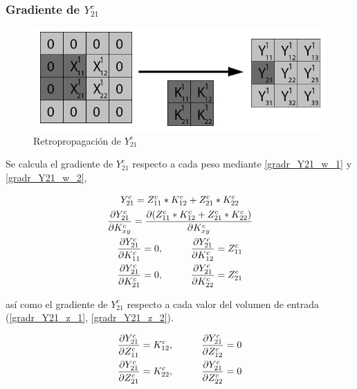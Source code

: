 \subsubsection{Gradiente de $Y^c_{21}$}

\begin{figure}[H]
	\centering
	\includegraphics[width=0.8\linewidth]{imagenes/conv_back_padding_4.jpg} 
	\caption{Retropropagación de $Y^c_{21}$}
\end{figure}

Se calcula el gradiente de $Y^c_{21}$ respecto a cada peso mediante \ref{gradr_Y21_w_1} y \ref{gradr_Y21_w_2},


\begin{gather}
	Y^c_{21} = Z^c_{11} * K^c_{12} + Z^c_{21} * K^c_{22} \\
	\frac{\partial Y^c_{21}}{\partial K^c_{xy}} = \frac{\partial (Z^c_{11} * K^c_{12} + Z^c_{21} * K^c_{22})}{\partial K^c_{xy}} \\
	\frac{\partial Y^c_{21}}{\partial K^c_{11}} = 0, \hspace{10mm} \frac{\partial Y^c_{21}}{\partial K^c_{12}} = Z^c_{11} \label{gradr_Y21_w_1} \\
	\frac{\partial Y^c_{21}}{\partial K^c_{21}} = 0, \hspace{10mm} \frac{\partial Y^c_{21}}{\partial K^c_{22}} = Z^c_{21} \label{gradr_Y21_w_2}
\end{gather}

así como el gradiente de $Y^c_{21}$ respecto a cada valor del volumen de entrada (\ref{gradr_Y21_z_1}, \ref{gradr_Y21_z_2}).

\begin{gather}
	\frac{\partial Y^c_{21}}{\partial Z^c_{11}} = K^c_{12}, \hspace{10mm} \frac{\partial Y^c_{21}}{\partial Z^c_{12}} = 0 \label{gradr_Y21_z_1} \\
	\frac{\partial Y^c_{21}}{\partial Z^c_{21}} = K^c_{22}, \hspace{10mm} \frac{\partial Y^c_{21}}{\partial Z^c_{22}} = 0
\end{gather} \label{gradr_Y21_z_2}

